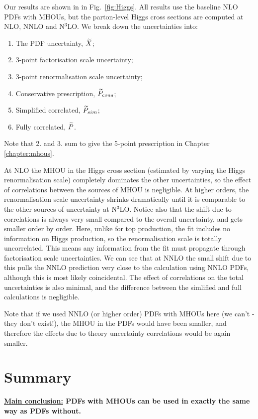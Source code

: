 Our results are shown in in Fig.~\ref{fig:Higgs}. All results use the baseline NLO PDFs with MHOUs, but the parton-level Higgs cross sections are computed at NLO, NNLO and N$^3$LO. We break down the uncertainties into: 
\begin{enumerate}
\item The PDF uncertainty, $\widetilde{X}$;
\item 3-point factorisation scale uncertainty; 
\item 3-point renormalisation scale uncertainty;
\item Conservative prescription, $\widetilde{P}_{cons}$;
\item Simplified correlated, $\widetilde{P}_{sim}$;
\item Fully correlated, $\widetilde{P}$.
\end{enumerate}
Note that 2. and 3. sum to give the 5-point prescription in Chapter \ref{chapter:mhous}. 

At NLO the MHOU in the Higgs cross section (estimated by varying the Higgs renormalisation scale) completely dominates the other uncertainties, so the effect of correlations between the sources of MHOU is negligible.  At higher orders, the renormalisation scale uncertainty shrinks dramatically until it is comparable to the other sources of uncertainty at N$^3$LO. Notice also that the shift due to correlations is always very small compared to the overall uncertainty, and gets smaller order by order. Here, unlike for top production, the fit includes no information on Higgs production, so the renormalisation scale is totally uncorrelated. This means any information from the fit must propagate through factorisation scale uncertainties. We can see that at NNLO the small shift due to this pulls the NNLO prediction very close to the calculation using NNLO PDFs, although this is most likely coincidental. The effect of correlations on the total uncertainties is also minimal, and the difference between the simlified and full calculations is negligible. 

Note that if we used NNLO (or higher order) PDFs with MHOUs here (we can't - they don't exist!), the MHOU in the PDFs would have been smaller, and therefore the effects due to theory uncertainty correlations would be again smaller.
\newpage
\section{Summary}
\label{sec:p5}

{\bf \underline{Main conclusion:} PDFs with MHOUs can be used in exactly the same way as PDFs without.}

